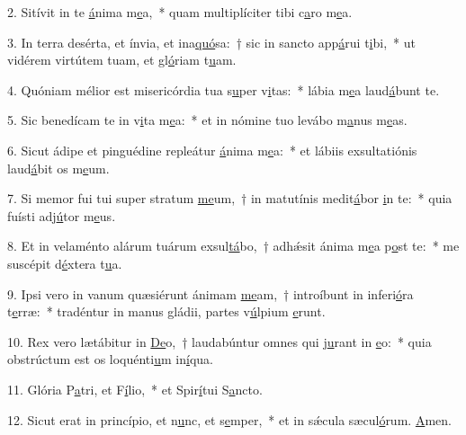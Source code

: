 2. Sitívit in te \uline{á}nima m\uline{e}a,~* quam multiplíciter tibi c\uline{a}ro m\uline{e}a.\par 
3. In terra desérta, et ínvia, et ina\uline{quó}sa:~† sic in sancto app\uline{á}rui t\uline{i}bi,~* ut vidérem virtútem tuam, et gl\uline{ó}riam t\uline{u}am.\par 
4. Quóniam mélior est misericórdia tua s\uline{u}per v\uline{i}tas:~* lábia m\uline{e}a laud\uline{á}bunt te.\par 
5. Sic benedícam te in v\uline{i}ta m\uline{e}a:~* et in nómine tuo levábo m\uline{a}nus m\uline{e}as.\par 
6. Sicut ádipe et pinguédine repleátur \uline{á}nima m\uline{e}a:~* et lábiis exsultatiónis laud\uline{á}bit os m\uline{e}um.\par 
7. Si memor fui tui super stratum \uline{me}um,~† in matutínis medit\uline{á}bor \uline{i}n te:~* quia fuísti adj\uline{ú}tor m\uline{e}us.\par 
8. Et in velaménto alárum tuárum exsul\uline{tá}bo,~† adhǽsit ánima m\uline{e}a p\uline{o}st te:~* me suscépit d\uline{é}xtera t\uline{u}a.\par 
9. Ipsi vero in vanum quæsiérunt ánimam \uline{me}am,~† introíbunt in inferi\uline{ó}ra t\uline{e}rræ:~* tradéntur in manus gládii, partes v\uline{ú}lpium \uline{e}runt.\par 
10. Rex vero lætábitur in \uline{De}o,~† laudabúntur omnes qui j\uline{u}rant in \uline{e}o:~* quia obstrúctum est os loquénti\uline{u}m in\uline{í}qua.\par 
11. Glória P\uline{a}tri, et F\uline{í}lio,~* et Spir\uline{í}tui S\uline{a}ncto.\par 
12. Sicut erat in princípio, et n\uline{u}nc, et s\uline{e}mper,~* et in sǽcula sæcul\uline{ó}rum. \uline{A}men.\par 
